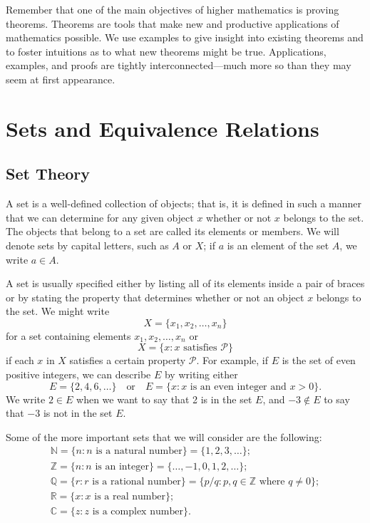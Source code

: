 Remember that one of the main objectives of higher mathematics is proving theorems. Theorems are tools that make new and productive applications of mathematics possible.  We use examples to give insight  into existing theorems and to foster intuitions as to what new theorems might be true.  Applications, examples, and proofs are tightly interconnected---much more so than they may seem at first appearance.
 
 
\section{Sets and Equivalence Relations}\label{sets_equivalence}
 
 
\subsection*{Set Theory}
 
A {\bfi set\/} is a well-defined collection of objects; that is, it is defined in such a manner that we can determine for any given object $x$ whether or not $x$ belongs to the set.  The objects that belong to a set are called its {\bfi elements} or {\bfi members}. We will denote sets by capital letters, such as $A$ or $X$; if $a$ is an element of the set $A$, we write $a \in A$\label{sets_membership}.

A set is usually specified either by listing all of its elements inside a pair of braces or by stating the property that determines whether or not an object $x$ belongs to the set. We might write
\[
X = \{ x_1, x_2, \ldots, x_n \}
\]
for a set containing elements $x_1, x_2, \ldots, x_n$ or
\[
X = \{ x :x \mbox{ satisfies ${\mathcal P}$}\}
\]
if each $x$ in $X$ satisfies a certain property ${\mathcal P}$.  For example, if $E$ is the set of even positive integers, we can describe $E$ by writing either 
\[
E = \{2, 4, 6, \ldots \}
\quad \text{or} \quad
E = \{ x : x \mbox{ is an even integer and $x > 0$} \}.
\]
We write $2 \in E$ when we want to say that 2 is in the set $E$, and $-3 \notin E$ to say that $-3$ is not in the set $E$.

Some of the more important sets that we will consider are the following: 
\begin{gather*}
{\mathbb N}\label{sets_naturalnum}  = \{n: n \mbox{ is a natural number}\}  = \{1, 2, 3, \ldots \}; \\
{\mathbb Z}\label{sets_integers}  = \{n : n \mbox{ is an integer} \} = \{\ldots, -1, 0, 1,  2, \ldots \} ; \\
{\mathbb Q}\label{sets_rationals} = \{r : r \mbox{ is a rational number}\} = \{p/q : p, q \in {\mathbb Z} \mbox{ where $q \neq 0$}\}; \\
{\mathbb R}\label{sets_reals} = \{ x : x \mbox{ is a real number} \}; \\
{\mathbb C}\label{sets_complexnum} = \{z : z \mbox{ is a complex number}\}.
\end{gather*}

